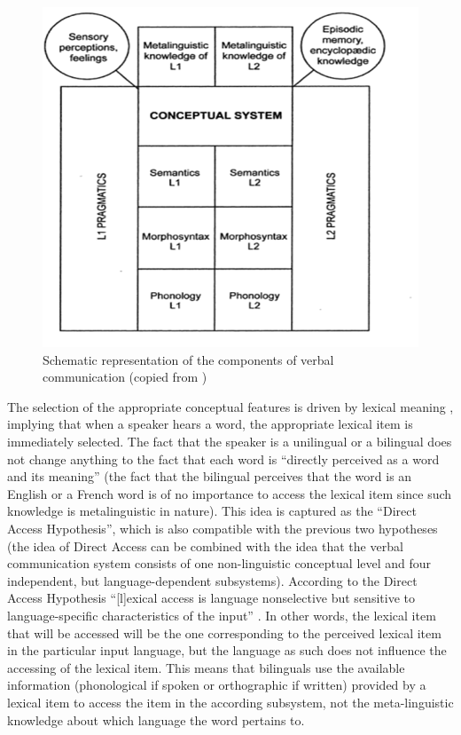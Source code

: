\begin{figure}
\includegraphics[height=.3\textheight]{figures/Vandevoorde2-img94.png}
\caption{\label{fig:5:91}  Schematic representation of the components of verbal communication (copied from \citealt[227]{paradis_neurolinguistic_2004})}
\end{figure}

The selection of the appropriate conceptual features is driven by lexical meaning \citep[203]{paradis_neurolinguistic_2004}, implying that when a speaker hears a word, the appropriate lexical item is immediately selected. The fact that the speaker is a unilingual or a bilingual does not change anything to the fact that each word is “directly perceived as a word and its meaning” \citep[203]{paradis_neurolinguistic_2004} (the fact that the bilingual perceives that the word is an English or a French word is of no importance to access the lexical item since such knowledge is metalinguistic in nature). This idea is captured as the “Direct Access Hypothesis”, which is also compatible with the previous two hypotheses (the idea of Direct Access can be combined with the idea that the verbal communication system consists of one non-linguistic conceptual level and four independent, but language-dependent subsystems). According to the Direct Access Hypothesis “[l]exical access is language nonselective but sensitive to language-specific characteristics of the input” \citep[205]{paradis_neurolinguistic_2004}. In other words, the lexical item that will be accessed will be the one corresponding to the perceived lexical item in the particular input language, but the language as such does not influence the accessing of the lexical item. This means that bilinguals use the available information (phonological if spoken or orthographic if written) provided by a lexical item to access the item in the according subsystem, not the meta-linguistic knowledge about which language the word pertains to.

